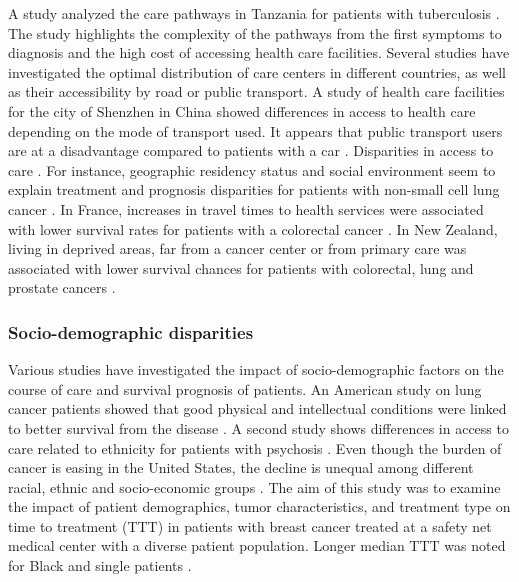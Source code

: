 A study analyzed the care pathways in Tanzania for patients with tuberculosis
\cite{mhalu_pathways_2019}. The study highlights the complexity of the pathways
from the first symptoms to diagnosis and the high cost of accessing health care
facilities. Several studies have investigated the optimal distribution of care
centers in different countries, as well as their accessibility by road or public
transport. A study of health care facilities for the city of Shenzhen in China
showed differences in access to health care depending on the mode of transport
used. It appears that public transport users are at a disadvantage compared to
patients with a car \cite{tao_spatial_2018}.
Disparities in access to care \cite{weiss_global_2020}.
For instance, geographic residency status and social environment seem
to explain treatment and prognosis disparities for patients with non-small cell
lung cancer \cite{johnson_treatment_2014}. In France, increases in travel times
to health services were associated with lower survival rates for patients with a
colorectal cancer \cite{dejardin_influence_2014}. In New Zealand, living in
deprived areas, far from a cancer center or from primary care was associated
with lower survival chances for patients with colorectal, lung and prostate
cancers \cite{haynes_cancer_2008}.

\subsubsection{Socio-demographic disparities}


Various studies have investigated the impact of socio-demographic factors on the
course of care and survival prognosis of patients. An American study on lung
cancer patients showed that good physical and intellectual conditions were
linked to better survival from the disease
\cite{pierzynski_socio-demographic_2018}. A second study shows differences in
access to care related to ethnicity for patients with psychosis
\cite{anderson_meta-analysis_2014}. Even though the burden of cancer is easing
in the United States, the decline is unequal among different racial, ethnic and
socio-economic groups \cite{viswanath_science_2005}. The aim of this study was
to examine the impact of patient demographics, tumor characteristics, and
treatment type on time to treatment (TTT) in patients with breast cancer treated
at a safety net medical center with a diverse patient population. Longer median
TTT was noted for Black and single patients \cite{khanna_impact_2017}.

